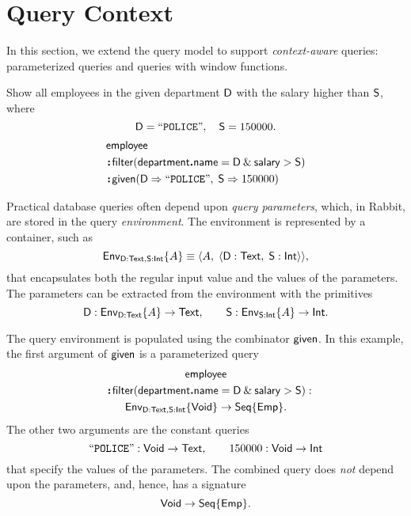 
\section{Query Context}
\label{sec:context}

In this section, we extend the query model to support \emph{context-aware}
queries: parameterized queries and queries with window functions.

\begin{demo}
    \label{ex:parameters}
    Show all employees in the given department $\mathsf{D}$ with the salary
    higher than $\mathsf{S}$, where
    \begin{equation*}
        \mathsf{D}=\mathtt{``POLICE"}, \quad \mathsf{S}=150000.
    \end{equation*}
    \begin{align*}
        & \mathsf{employee} \\
        & \!\boldsymbol{:}\!\mathsf{filter}(\mathsf{department}\boldsymbol{.}\mathsf{name} = \mathsf{D} \mathbin{\&} \mathsf{salary} > \mathsf{S}) \\
        & \!\boldsymbol{:}\!\mathsf{given}(\mathsf{D} \Rightarrow \mathtt{``POLICE"},\; \mathsf{S} \Rightarrow 150000)
    \end{align*}
\end{demo}

Practical database queries often depend upon \emph{query parameters}, which, in
Rabbit, are stored in the query \emph{environment}.  The
environment is represented by a container, such as
\begin{equation*}
    \mathsf{Env}_{\mathsf{D}:\mathsf{Text},\mathsf{S}:\mathsf{Int}}{\left\{A\right\}} \equiv \langle A,\; \langle \mathsf{D}:\mathsf{Text},\; \mathsf{S}:\mathsf{Int} \rangle \rangle,
\end{equation*}
that encapsulates both the regular input value and the values of the
parameters.  The parameters can be extracted from the environment with the
primitives
\begin{equation*}
    \mathsf{D} : \mathsf{Env}_{\mathsf{D}:\mathsf{Text}}{\left\{A\right\}} \to \mathsf{Text}, \qquad
    \mathsf{S} : \mathsf{Env}_{\mathsf{S}:\mathsf{Int}}{\left\{A\right\}} \to \mathsf{Int}.
\end{equation*}

The query environment is populated using the combinator $\mathsf{given}$.  In this
example, the first argument of $\mathsf{given}$ is a parameterized query
\begin{multline*}
    \Employee \\
    \shoveleft{\Apply\Filter(\Department\To\Name = \DEPARTMENT \mathbin{\&} \Salary > \SALARY) : } \\
    \Env{\DEPARTMENT:\Text,\SALARY:\Int}{\Void} \to \Seq{\Emp}.
\end{multline*}
The other two arguments are the constant queries
\begin{equation*}
    \mathtt{``POLICE"} : \mathsf{Void} \to \mathsf{Text}, \qquad
    150000 : \mathsf{Void} \to \mathsf{Int}
\end{equation*}
that specify the values of the parameters.  The combined query does \emph{not}
depend upon the parameters, and, hence, has a signature
\begin{equation*}
    \mathsf{Void} \to \mathsf{Seq}{\left\{\mathsf{Emp}\right\}}.
\end{equation*}

